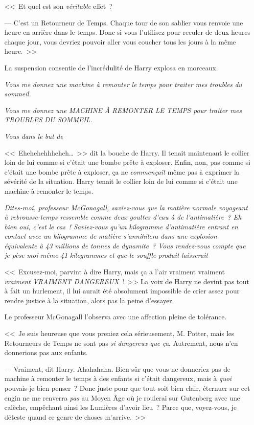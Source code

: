 <<~Et quel est son \emph{véritable} effet~?

--- C'est un Retourneur de Temps. Chaque tour de son sablier vous renvoie une heure en arrière dans le temps. Donc si vous l'utilisez pour reculer de deux heures chaque jour, vous devriez pouvoir aller vous coucher tous les jours à la même heure.~>>

La suspension consentie de l'incrédulité de Harry explosa en morceaux.

\emph{Vous me donnez une machine à remonter le temps pour traiter mes troubles du sommeil.}

\emph{Vous me donnez une MACHINE À REMONTER LE TEMPS pour traiter mes TROUBLES DU SOMMEIL.}

\emph{Vous  dans le but de }

<<~Ehehehehhheheh…~>> dit la bouche de Harry. Il tenait maintenant le collier loin de lui comme si c'était une bombe prête à exploser. Enfin, non, pas comme si c'était une bombe prête à exploser, ça ne \emph{commençait} même pas à exprimer la sévérité de la situation. Harry tenait le collier loin de lui comme si c'était une machine à remonter le temps.

\emph{Dites-moi, professeur McGonagall, saviez-vous que la matière normale voyageant à rebrousse-temps ressemble comme deux gouttes d'eau à de l'antimatière~? Eh bien oui, c'est le cas~! Saviez-vous qu'un kilogramme d'antimatière entrant en contact avec un kilogramme de matière s'annihilera dans une explosion équivalente à 43 millions de tonnes de dynamite~? Vous rendez-vous compte que je pèse moi-même 41 kilogrammes et que le souffle produit laisserait }

<<~Excusez-moi, parvint à dire Harry, mais ça a l'air vraiment vraiment \emph{vraiment} \emph{VRAIMENT DANGEREUX}~!~>> La voix de Harry ne devint pas tout à fait un hurlement, il lui aurait été absolument impossible de crier assez pour rendre justice à la situation, alors pas la peine d'essayer.

Le professeur McGonagall l'observa avec une affection pleine de tolérance.

<<~Je suis heureuse que vous preniez cela sérieusement, M. Potter, mais les Retourneurs de Temps ne sont pas \emph{si dangereux que ça}. Autrement, nous n'en donnerions pas aux enfants.

--- Vraiment, dit Harry. Ahahahaha. Bien sûr que vous ne donneriez pas de machine à remonter le temps à des enfants si c'était dangereux, mais à \emph{quoi} pouvais-je bien penser~? Donc juste pour que tout soit bien clair, éternuer sur cet engin ne me renverra \emph{pas} au Moyen Âge où je roulerai sur Gutenberg avec une calèche, empêchant ainsi les Lumières d'avoir lieu~? Parce que, voyez-vous, je déteste quand ce genre de choses m'arrive.~>>

